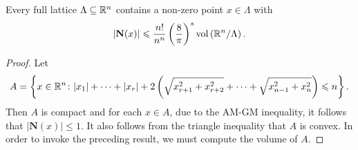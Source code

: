 \begin{theorem}
    Every full lattice $\Lambda\subseteq\mathbb{R}^n$ contains a non-zero point $x\in\Lambda$ with 
    \begin{equation*}
        |\mathbf N(x)|\leqslant\frac{n!}{n^n}\left(\frac{8}{\pi}\right)^s\operatorname{vol}\left(\mathbb{R}^n/\Lambda\right).
    \end{equation*}
\end{theorem}
\begin{proof}
    Let 
    \begin{equation*}
        A = \left\{x\in\mathbb{R}^n\colon |x_1| + \dots + |x_r| + 2\left(\sqrt{x_{r + 1}^2 + x_{r + 2}^2} + \dots + \sqrt{x_{n - 1}^2 + x_n^2}\right)\leqslant n\right\}.
    \end{equation*}
    Then $A$ is compact and for each $x\in A$, due to the AM-GM inequality, it follows that $|\mathbf N(x)|\le 1$. It also follows from the triangle inequality that $A$ is convex. In order to invoke the preceding result, we must compute the volume of $A$.


\end{proof}
